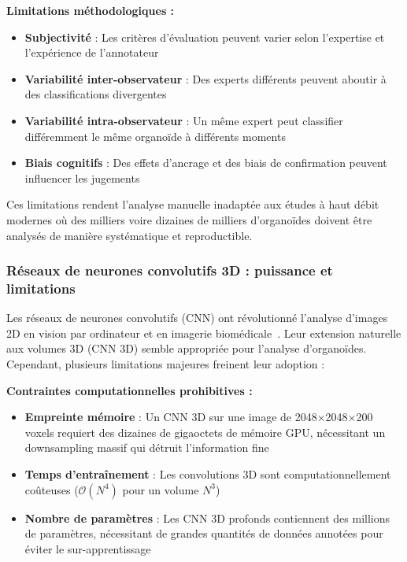 \textbf{Limitations méthodologiques :}
\begin{itemize}
    \item \textbf{Subjectivité} : Les critères d'évaluation peuvent varier selon l'expertise et l'expérience de l'annotateur
    \item \textbf{Variabilité inter-observateur} : Des experts différents peuvent aboutir à des classifications divergentes
    \item \textbf{Variabilité intra-observateur} : Un même expert peut classifier différemment le même organoïde à différents moments
    \item \textbf{Biais cognitifs} : Des effets d'ancrage et des biais de confirmation peuvent influencer les jugements
\end{itemize}

Ces limitations rendent l'analyse manuelle inadaptée aux études à haut débit modernes où des milliers voire dizaines de milliers d'organoïdes doivent être analysés de manière systématique et reproductible.

\subsubsection{Réseaux de neurones convolutifs 3D : puissance et limitations}

Les réseaux de neurones convolutifs (CNN) ont révolutionné l'analyse d'images 2D en vision par ordinateur et en imagerie biomédicale~\cite{LeCun2015,Krizhevsky2012}. Leur extension naturelle aux volumes 3D (CNN 3D) semble appropriée pour l'analyse d'organoïdes. Cependant, plusieurs limitations majeures freinent leur adoption :

\textbf{Contraintes computationnelles prohibitives :}
\begin{itemize}
    \item \textbf{Empreinte mémoire} : Un CNN 3D sur une image de 2048×2048×200 voxels requiert des dizaines de gigaoctets de mémoire GPU, nécessitant un downsampling massif qui détruit l'information fine
    \item \textbf{Temps d'entraînement} : Les convolutions 3D sont computationnellement coûteuses ($\mathcal{O}(N^4)$ pour un volume $N^3$)
    \item \textbf{Nombre de paramètres} : Les CNN 3D profonds contiennent des millions de paramètres, nécessitant de grandes quantités de données annotées pour éviter le sur-apprentissage
\end{itemize}

